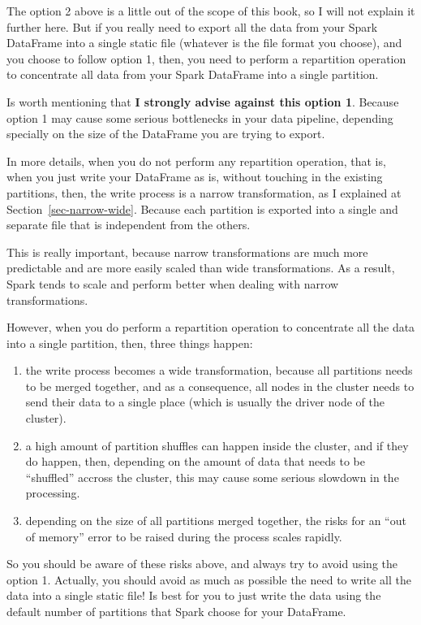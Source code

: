 \documentclass[
  11pt,
  letterpaper,
  DIV=11,
  numbers=noendperiod]{scrreprt}
\begin{document}
The option 2 above is a little out of the scope of this book, so I will
not explain it further here. But if you really need to export all the
data from your Spark DataFrame into a single static file (whatever is
the file format you choose), and you choose to follow option 1, then,
you need to perform a repartition operation to concentrate all data from
your Spark DataFrame into a single partition.

Is worth mentioning that \textbf{I strongly advise against this option
1}. Because option 1 may cause some serious bottlenecks in your data
pipeline, depending specially on the size of the DataFrame you are
trying to export.

In more details, when you do not perform any repartition operation, that
is, when you just write your DataFrame as is, without touching in the
existing partitions, then, the write process is a narrow transformation,
as I explained at Section~\ref{sec-narrow-wide}. Because each partition
is exported into a single and separate file that is independent from the
others.

This is really important, because narrow transformations are much more
predictable and are more easily scaled than wide transformations. As a
result, Spark tends to scale and perform better when dealing with narrow
transformations.

However, when you do perform a repartition operation to concentrate all
the data into a single partition, then, three things happen:

\begin{enumerate}
\def\labelenumi{\arabic{enumi}.}
\item
  the write process becomes a wide transformation, because all
  partitions needs to be merged together, and as a consequence, all
  nodes in the cluster needs to send their data to a single place (which
  is usually the driver node of the cluster).
\item
  a high amount of partition shuffles can happen inside the cluster, and
  if they do happen, then, depending on the amount of data that needs to
  be ``shuffled'' accross the cluster, this may cause some serious
  slowdown in the processing.
\item
  depending on the size of all partitions merged together, the risks for
  an ``out of memory'' error to be raised during the process scales
  rapidly.
\end{enumerate}

So you should be aware of these risks above, and always try to avoid
using the option 1. Actually, you should avoid as much as possible the
need to write all the data into a single static file! Is best for you to
just write the data using the default number of partitions that Spark
choose for your DataFrame.
\end{document}
